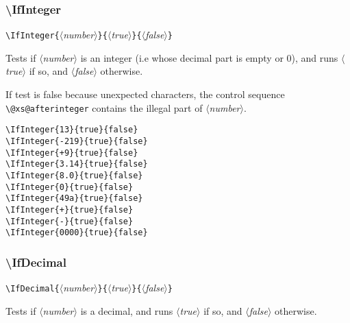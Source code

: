 \documentclass[a4paper,10pt]{article}
\newcommand\argu[1]{$\langle$\textit{#1}$\rangle$}
\newcommand\ARGU[1]{\texttt{\{}\argu{#1}\texttt{\}}}
\newcommand\styleexemple{\small\vskip4pt}
\newcommand\verbinline{\lstinline[basicstyle=\normalsize\ttfamily]}
\begin{document}
\subsubsection{\ttfamily\textbackslash IfInteger}

\verbinline|\IfInteger|\ARGU{number}\ARGU{true}\ARGU{false}
\smallskip

Tests if \argu{number} is an integer (i.e whose decimal part is empty or 0), and runs \argu{true} if so, and \argu{false} otherwise.\smallskip

If test is false because unexpected characters, the control sequence \verbinline|\@xs@afterinteger| contains the illegal part of \argu{number}.\medskip

\begin{minipage}[t]{0.65\linewidth}
\begin{lstlisting}
\IfInteger{13}{true}{false}
\IfInteger{-219}{true}{false}
\IfInteger{+9}{true}{false}
\IfInteger{3.14}{true}{false}
\IfInteger{8.0}{true}{false}
\IfInteger{0}{true}{false}
\IfInteger{49a}{true}{false}
\IfInteger{+}{true}{false}
\IfInteger{-}{true}{false}
\IfInteger{0000}{true}{false}
\end{lstlisting}%
\end{minipage}\hfill
\begin{minipage}[t]{0.35\linewidth}
	\styleexemple
	\par
	\par
	\par
	\par
	\par
	\par
	\par
	\par
	\par
\end{minipage}%

\subsubsection{\ttfamily\textbackslash IfDecimal}\label{ifdecimal}

\verbinline|\IfDecimal|\ARGU{number}\ARGU{true}\ARGU{false}
\smallskip

Tests if \argu{number} is a decimal, and runs \argu{true} if so, and \argu{false} otherwise.\smallskip
\end{document}
